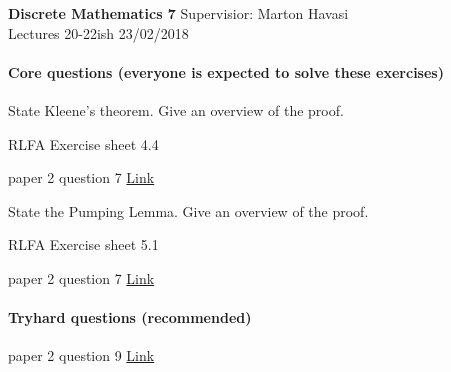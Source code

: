 \documentclass{exam}
\begin{document}
\noindent
\large\textbf{Discrete Mathematics 7} \hfill Supervisior: Marton Havasi \\
\normalsize Lectures 20-22ish \hfill 23/02/2018

\paragraph{Core questions (everyone is expected to solve these exercises)}
\begin{questions}

\question State Kleene's theorem. Give an overview of the proof.

\question RLFA Exercise sheet 4.4

 paper 2 question 7 \href{http://www.cl.cam.ac.uk/teaching/exams/pastpapers/y1999p2q7.pdf}{Link}

\question State the Pumping Lemma. Give an overview of the proof.

\question RLFA Exercise sheet 5.1

 paper 2 question 7 \href{http://www.cl.cam.ac.uk/teaching/exams/pastpapers/y1998p2q7.pdf}{Link}

\end{questions}

\paragraph{Tryhard questions (recommended)}
\begin{questions}

 paper 2 question 9 \href{http://www.cl.cam.ac.uk/teaching/exams/pastpapers/y2004p2q9.pdf}{Link}


\end{questions}
\end{document}
